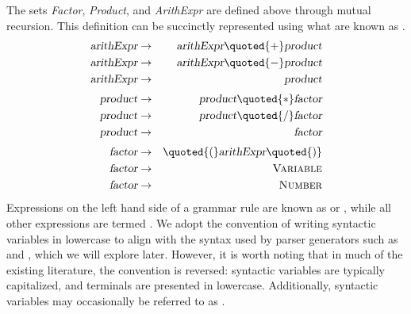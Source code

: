 The sets \textsl{Factor}, \textsl{Product}, and \textsl{ArithExpr} are defined above through mutual
recursion. This definition can be succinctly represented using what are known as . 
\begin{eqnarray*}
  \textsl{arithExpr} & \rightarrow & \textsl{arithExpr} \quoted{+} \textsl{product}  \\
  \textsl{arithExpr} & \rightarrow & \textsl{arithExpr} \quoted{-} \textsl{product}  \\
  \textsl{arithExpr} & \rightarrow & \textsl{product}                                \\[0.1cm]
  \textsl{product} & \rightarrow & \textsl{product} \quoted{*} \textsl{factor}     \\
  \textsl{product} & \rightarrow & \textsl{product} \quoted{/} \textsl{factor}     \\
  \textsl{product} & \rightarrow & \textsl{factor}                                 \\[0.1cm]
  \textsl{factor} & \rightarrow & \quoted{(} \textsl{arithExpr} \quoted{)}        \\
  \textsl{factor} & \rightarrow & \textsc{Variable}                               \\
  \textsl{factor} & \rightarrow & \textsc{Number} 
\end{eqnarray*}
Expressions on the left hand side of a grammar rule are known as  or , while all other expressions are termed
. We adopt the convention of writing syntactic variables in lowercase to align
with the syntax used by parser generators such as  and , which we will
explore later. However, it is worth noting that in much of the existing literature, the convention is reversed:
syntactic variables are typically capitalized, and terminals are presented in lowercase. Additionally,
syntactic variables may occasionally be referred to as . 


